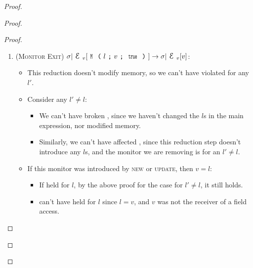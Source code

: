 \begin{Assumption}
\begin{Assumption}
\begin{Assumption}
\begin{proof}
\begin{proof}
\begin{ienumerate}
\begin{enumerate}
\begin{proof}
\begin{enumerate}
\item (\textsc{Monitor Exit}) $\sigma|\EV[\M{l}{v}{\Kw{true}}]\rightarrow \sigma|\EV[v]$:
\begin{itemize}
\item This reduction doesn't modify memory, so we can't have violated \CNC for any $l'$.
\item Consider any $l' \neq l$:
\begin{itemize}
\item We can't have broken \CNE, since we haven't changed the $l$s in the main expression, nor modified memory.
\item Similarly, we can't have affected \CNO, since this reduction step doesn't introduce any $l$s, and the monitor we are removing is for an $l' \neq l$.
\end{itemize}
\item If this monitor was introduced by \textsc{new} or \textsc{update}, then $v = l$:
\begin{itemize}
\item If \CNE held for $l$, by the above proof for the case for $l' \neq l$, it still holds.
\item \CNO can't have held for $l$ since $l = v$, and $v$ was not the receiver of a field access.
\end{itemize}


\end{itemize}
\end{enumerate}
\end{proof}
\end{enumerate}
\end{ienumerate}
\end{proof}
\end{proof}
\end{Assumption}
\end{Assumption}
\end{Assumption}
